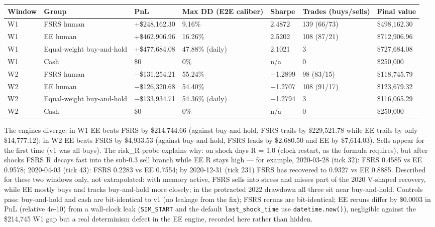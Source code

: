 \documentclass[11pt]{article}
\begin{document}
\begin{table}[htbp]
\centering
\begin{tabular}{lllllll}
\toprule
\textbf{Window} & \textbf{Group} & \textbf{PnL} & \textbf{Max DD (E2E caliber)} & \textbf{Sharpe} & \textbf{Trades (buys/sells)} & \textbf{Final value} \\
\midrule
W1 & FSRS human & +\$248,162.30 & 9.16\% & 2.4872 & 139 (66/73) & \$498,162.30 \\
W1 & EE human & +\$462,906.96 & 16.26\% & 2.5202 & 108 (87/21) & \$712,906.96 \\
W1 & Equal-weight buy-and-hold & +\$477,684.08 & 47.88\% (daily) & 2.1021 & 3 & \$727,684.08 \\
W1 & Cash & \$0 & 0\% & n/a & 0 & \$250,000 \\
W2 & FSRS human & $-$\$131,254.21 & 55.24\% & $-$1.2899 & 98 (83/15) & \$118,745.79 \\
W2 & EE human & $-$\$126,320.68 & 54.40\% & $-$1.2707 & 108 (91/17) & \$123,679.32 \\
W2 & Equal-weight buy-and-hold & $-$\$133,934.71 & 54.36\% (daily) & $-$1.2794 & 3 & \$116,065.29 \\
W2 & Cash & \$0 & 0\% & n/a & 0 & \$250,000 \\
\bottomrule
\end{tabular}
\end{table}

The engines diverge: in W1 EE beats FSRS by \$214,744.66 (against buy-and-hold, FSRS trails by \$229,521.78 while EE trails by only \$14,777.12); in W2 EE beats FSRS by \$4,933.53 (against buy-and-hold, FSRS leads by \$2,680.50 and EE by \$7,614.03). Sells appear for the first time (v1 was all buys). The risk\_R probe explains why: on shock days R = 1.0 (clock restart, as the formula requires), but after shocks FSRS R decays fast into the sub-0.3 sell branch while EE R stays high --- for example, 2020-03-28 (tick 32): FSRS 0.4585 vs EE 0.9578; 2020-04-03 (tick 43): FSRS 0.2283 vs EE 0.7554; by 2020-12-31 (tick 231) FSRS has recovered to 0.9327 vs EE 0.8885. Described for these two windows only, not extrapolated: with memory active, FSRS sells into stress and misses part of the 2020 V-shaped recovery, while EE mostly buys and tracks buy-and-hold more closely; in the protracted 2022 drawdown all three sit near buy-and-hold. Controls pass: buy-and-hold and cash are bit-identical to v1 (no leakage from the fix); FSRS reruns are bit-identical; EE reruns differ by \$0.0003 in PnL (relative 4e-10) from a wall-clock leak (\texttt{SIM\_START} and the default \texttt{last\_shock\_time} use \texttt{datetime.now()}), negligible against the \$214,745 W1 gap but a real determinism defect in the EE engine, recorded here rather than hidden.
\end{document}
